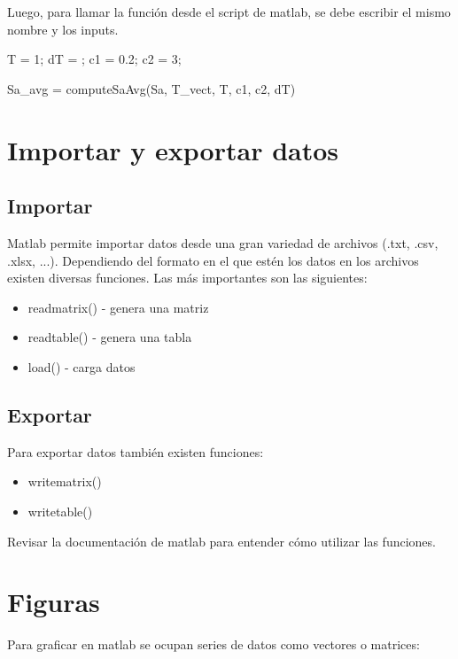 \noindent Luego, para llamar la función desde el script de matlab, se debe escribir el mismo nombre y los inputs.

\begin{verbatimg}
    T = 1;      %
    dT = ;      %
    c1 = 0.2;   %
    c2 = 3;     %

    Sa_avg = computeSaAvg(Sa, T_vect, T, c1, c2, dT)
\end{verbatimg}

\newpage
\section{Importar y exportar datos}
\subsection{Importar}
Matlab permite importar datos desde una gran variedad de archivos (.txt, .csv, .xlsx, ...). Dependiendo del formato en el que estén los datos en los archivos existen diversas funciones. Las más importantes son las siguientes:

\begin{itemize}
    \item readmatrix()  - genera una matriz
    \item readtable()   - genera una tabla
    \item load()        - carga datos
\end{itemize}

\subsection{Exportar}
Para exportar datos también existen funciones:
\begin{itemize}
    \item writematrix()
    \item writetable() 
\end{itemize}

\noindent Revisar la documentación de matlab para entender cómo utilizar las funciones.

\section{Figuras}
Para graficar en matlab se ocupan series de datos como vectores o matrices:

